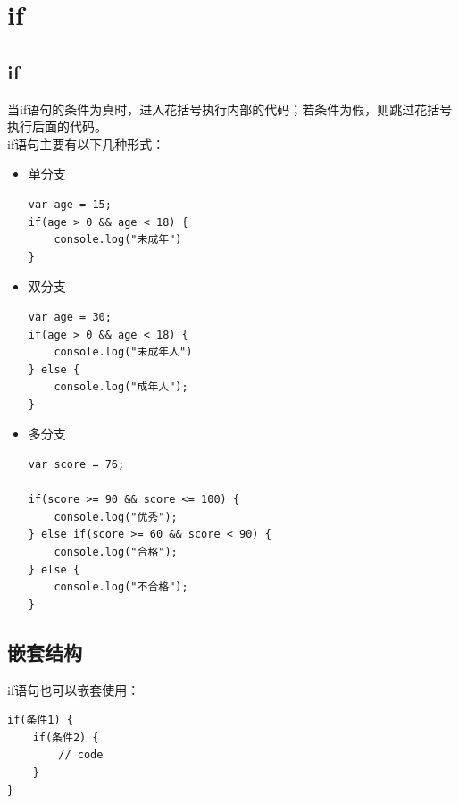 \newpage

\section{if}

\subsection{if}

当if语句的条件为真时，进入花括号执行内部的代码；若条件为假，则跳过花括号执行后面的代码。 \\

if语句主要有以下几种形式：

\begin{itemize}
	\item 单分支
	      \begin{lstlisting}[style=htmlcssjs]
var age = 15;
if(age > 0 && age < 18) {
    console.log("未成年")
}
        \end{lstlisting}

	\item 双分支
	      \begin{lstlisting}[style=htmlcssjs]
var age = 30;
if(age > 0 && age < 18) {
    console.log("未成年人")
} else {
    console.log("成年人");
}
\end{lstlisting}

	\item 多分支
	      \begin{lstlisting}[style=htmlcssjs]
var score = 76;

if(score >= 90 && score <= 100) {
    console.log("优秀");
} else if(score >= 60 && score < 90) {
    console.log("合格");
} else {
    console.log("不合格");
}
        \end{lstlisting}
\end{itemize}

\subsection{嵌套结构}

if语句也可以嵌套使用： \\

\begin{lstlisting}[style=htmlcssjs]
if(条件1) {
    if(条件2) {
        // code
    }
}
\end{lstlisting}

 \\

